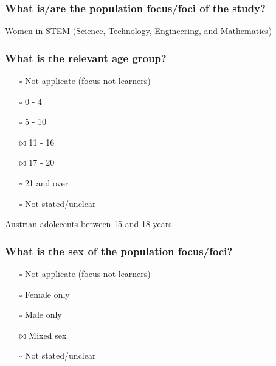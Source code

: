 \documentclass[
  doc, a4paper]{apa7}
\providecommand{\tightlist}{%
  \setlength{\itemsep}{0pt}\setlength{\parskip}{0pt}}
\begin{document}
\subsubsection{What is/are the population focus/foci of the study?}\label{what-isare-the-population-focusfoci-of-the-study}

Women in STEM (Science, Technology, Engineering, and Mathematics)

\subsubsection{What is the relevant age group?}\label{what-is-the-relevant-age-group}

\begin{itemize}
\tightlist
\item[$\square$]
  Not applicate (focus not learners)\\
\item[$\square$]
  0 - 4\\
\item[$\square$]
  5 - 10\\
\item[$\boxtimes$]
  11 - 16\\
\item[$\boxtimes$]
  17 - 20\\
\item[$\square$]
  21 and over\\
\item[$\square$]
  Not stated/unclear
\end{itemize}

Austrian adolecents between 15 and 18 years

\subsubsection{What is the sex of the population focus/foci?}\label{what-is-the-sex-of-the-population-focusfoci}

\begin{itemize}
\tightlist
\item[$\square$]
  Not applicate (focus not learners)\\
\item[$\square$]
  Female only\\
\item[$\square$]
  Male only\\
\item[$\boxtimes$]
  Mixed sex\\
\item[$\square$]
  Not stated/unclear
\end{itemize}
\end{document}
